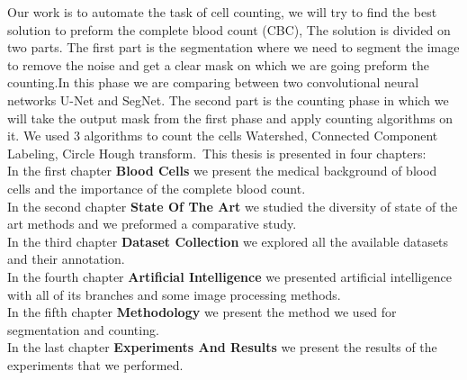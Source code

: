 Our work is to automate the task of cell counting, we will  try to find the best solution to preform the complete blood count (CBC), The solution is divided on two parts.
The first part is the segmentation where we need to segment the image to remove the noise and get a clear mask on which we are going preform the counting.In this phase we are comparing between two convolutional neural networks U-Net and SegNet.
The second part is the counting phase in which we will take  the output mask from the first phase and apply counting algorithms on it. We used 3 algorithms to count the cells Watershed, Connected Component Labeling, Circle Hough transform.\
This thesis is presented in four chapters:\\
In the first chapter \textbf{Blood Cells} we present the medical background of blood cells and the importance of the complete blood count.\\
In the second chapter \textbf{State Of The Art} we studied the diversity of state of the art methods and we preformed a comparative study.\\
In the third chapter \textbf{Dataset Collection} we explored all the available datasets and their annotation.\\
In the fourth chapter \textbf{Artificial Intelligence} we presented artificial intelligence with all of its branches and some image processing methods.\\
In the fifth chapter \textbf{Methodology} we present the method we used for segmentation and counting.\\
In the last chapter \textbf{Experiments And Results} we present the results of the experiments that we performed.

